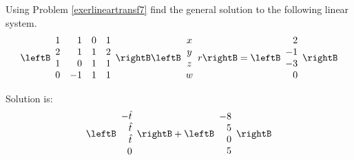 \begin{enumialphparenastyle}
\begin{ex} Using Problem \ref{exerlineartransf7} find the general solution to the
following linear system.
\begin{equation*}
\leftB
\begin{array}{rrrr}
1 & 1 & 0 & 1 \\
2 & 1 & 1 & 2 \\
1 & 0 & 1 & 1 \\
0 & -1 & 1 & 1
\end{array}
\rightB \leftB
\begin{array}{c}
x \\
y \\
z \\
w
\end{array}r
\rightB =\leftB
\begin{array}{r}
2 \\
-1 \\
-3 \\
0
\end{array}
\rightB 
\end{equation*}
\begin{sol}
Solution is:
\[
\leftB
\begin{array}{r}
-\hat{t} \\
\hat{t} \\
\hat{t} \\
0
\end{array}
\rightB +\leftB
\begin{array}{r}
-8 \\
5 \\
0 \\
5
\end{array}
\rightB
\]
\end{sol}
\end{ex}


\end{enumialphparenastyle}
